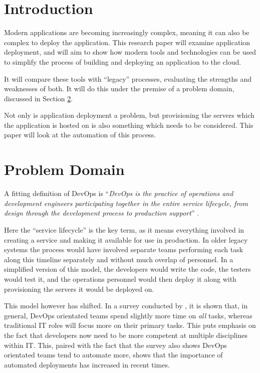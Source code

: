 \documentclass{article}
\author{Stephen Coady}
\begin{document}

\thispagestyle{empty}

\newpage
\tableofcontents
\newpage

\newpage
\section{Introduction} %
\label{sec:Introduction}
Modern applications are becoming increasingly complex, meaning it can also be complex to deploy the application. This research paper will examine application deployment, and will aim to show how modern tools and technologies can be used to simplify the process of building and deploying an application to the cloud. 

It will compare these tools with ``legacy'' processes, evaluating the strengths and weaknesses of both. It will do this under the premise of a problem domain, discussed in Section \ref{sec:Problem}.

Not only is application deployment a problem, but provisioning the servers which the application is hosted on is also something which needs to be considered. This paper will look at the automation of this process.

\section{Problem Domain}
\label{sec:Problem}

A fitting definition of DevOps is ``\textit{DevOps is the practice of operations and development engineers participating together in the entire service lifecycle, from design through the development process to production support}'' \citep{devops}.

Here the ``service lifecycle'' is the key term, as it means everything involved in creating a service and making it available for use in production. In older legacy systems the process would have involved separate teams performing each task along this timeline separately and without much overlap of personnel. In a simplified version of this model, the developers would write the code, the testers would test it, and the operations personnel would then deploy it along with provisioning the servers it would be deployed on.

This model however has shifted. In a survey conducted by \citep{survey}, it is shown that, in general, DevOps orientated teams spend slightly more time on \textit{all} tasks, whereas traditional IT roles will focus more on their primary tasks. This puts emphasis on the fact that developers now need to be more competent at multiple disciplines within IT. This, paired with the fact that the survey also shows DevOps orientated teams tend to automate more, shows that the importance of automated deployments has increased in recent times. 
\end{document}
